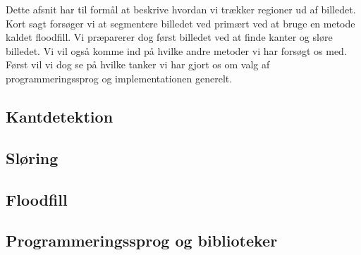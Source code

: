 {
{\sffamily Dette afsnit har til formål at beskrive hvordan vi trækker
regioner ud af billedet. Kort sagt forsøger vi at segmentere billedet
ved primært ved at bruge en metode kaldet floodfill. Vi præparerer dog
først billedet ved at finde kanter og sløre billedet. Vi vil også komme
ind på hvilke andre metoder vi har forsøgt os med. Først vil vi dog se
på hvilke tanker vi har gjort os om valg af programmeringssprog og
implementationen generelt.
}

\subsection{Kantdetektion}


\subsection{Sløring}


\subsection{Floodfill}


\subsection{Programmeringssprog og biblioteker}


}

